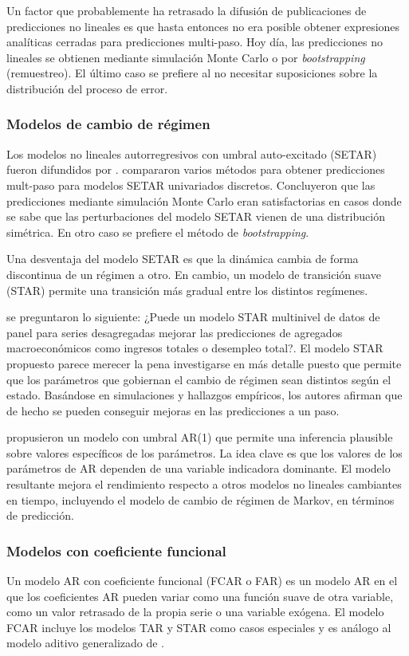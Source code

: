 \documentclass{llncs}
\begin{document}
Un factor que probablemente ha retrasado la difusión de publicaciones de predicciones no lineales es que hasta entonces no era posible obtener expresiones analíticas cerradas para predicciones multi-paso. Hoy día, las predicciones no lineales se obtienen mediante simulación Monte Carlo o por \emph{bootstrapping} (remuestreo). El último caso se prefiere al no necesitar suposiciones sobre la distribución del proceso de error.

\subsubsection{Modelos de cambio de régimen}
Los modelos no lineales autorregresivos con umbral auto-excitado (SETAR) fueron difundidos por \cite{Tong1990}.  \cite{Clements1997463} compararon varios métodos para obtener predicciones mult-paso para modelos SETAR univariados discretos. Concluyeron que las predicciones mediante simulación Monte Carlo eran satisfactorias en casos donde se sabe que las perturbaciones del modelo SETAR vienen de una distribución simétrica. En otro caso se prefiere el método de \emph{bootstrapping}. 

Una desventaja del modelo SETAR es que la dinámica cambia de forma discontinua de un régimen a otro. En cambio, un modelo de transición suave (STAR) permite una transición más gradual entre los distintos regímenes. 

\cite{Fok2005785} se preguntaron lo siguiente: ¿Puede un modelo STAR multinivel de datos de panel para series desagregadas mejorar las predicciones de agregados macroeconómicos como ingresos totales o desempleo total?. El modelo STAR propuesto parece merecer la pena investigarse en más detalle puesto que permite que los parámetros que gobiernan el cambio de régimen sean distintos según el estado. Basándose en simulaciones y hallazgos empíricos, los autores afirman que de hecho se pueden conseguir mejoras en las predicciones a un paso.

\cite{Franses2004255} propusieron un modelo con umbral AR(1) que permite una inferencia plausible sobre valores específicos de los parámetros. La idea clave es que los valores de los parámetros de AR dependen de una variable indicadora dominante. El modelo resultante mejora el rendimiento respecto a otros modelos no lineales cambiantes en tiempo, incluyendo el modelo de cambio de régimen de Markov, en términos de predicción.

\subsubsection{Modelos con coeficiente funcional}
Un modelo AR con coeficiente funcional (FCAR o FAR) es un modelo AR en el que los coeficientes AR pueden variar como una función suave de otra variable, como un valor retrasado de la propia serie o una variable exógena. El modelo FCAR incluye los modelos TAR y STAR como casos especiales y es análogo al modelo aditivo generalizado de \cite{Hastie1990}. 
\end{document}
